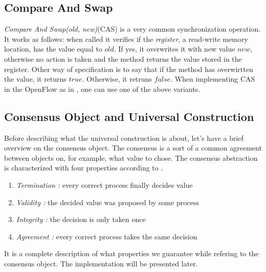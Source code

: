 \documentclass{article}
\begin{document}
\subsection{Compare And Swap}
\emph{Compare And Swap(old, new)}(CAS) is a very common synchronization operation. It works as follows: when called it verifies if the \emph{register}, a read-write memory location, has the value equal to $old$. If yes, it overwrites it with new value $new$, otherwise no action is taken and the method returns the value stored in the register. Other way of specification is to say that if the method has overwirtten the value, it returns $true$. Otherwise, it retruns $false$.
When implementing CAS in the OpenFlow as in \cite{In-band}, one can use one of the above variants. 
\subsection{Consensus Object and Universal Construction}
Before describing what the universal construction is about, let's have a brief overview on the consensus object. The consensus is a sort of a common agreement between objects on, for example, what value to chose.
The consensus abstraction is characterized with four properties according to \cite{Guerraoui:2010:IRD:1951643}.
\begin{enumerate}
\item \emph{Termination :} every correct process finally decides value
\item \emph{Validity :} the decided value was proposed by some process
\item \emph{Integrity :} the decision is only taken once
\item \emph{Agreement :} every correct process takes the same decision
\end{enumerate}
It is a complete description of what properties we guarantee while refering to the consensus object. The implementation will be presented later.
\end{document}
